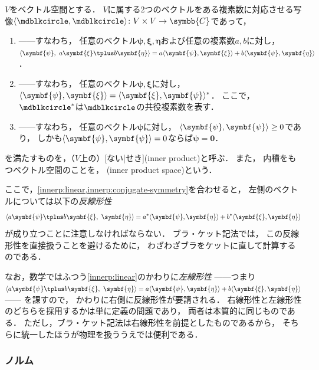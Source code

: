 \documentclass[
]{sotsu}
\newcommand{\bpsi}{\symbf{\psi}}
\newcommand{\bxi}{\symbf{\xi}}
\newcommand{\beeta}{\symbf{\eta}}
\newcommand{\fire}[1]{\textcolor{fire}{#1}}
\begin{document}
$V$をベクトル空間とする．
$V$に属する2つのベクトルをある複素数に対応させる写像$\iparen{\bigdot, \bigdot} \colon V \times V \to \symbb{C}$であって，
\begin{enumerate}
    \item \label{innerp:linear} 
        ------すなわち，
        \fire{任意のベクトル$\bpsi, \bxi, \beeta$}および\fire{任意の複素数$a, b$}に対し，
        $\iparen{\bpsi, \  a \bxi \vecplus b \beeta} = a \iparen{\bpsi, \bxi} + b \iparen{\bpsi, \beeta}$．
    \item \label{innerp:conjugate-symmetry} 
        ------すなわち，
        \fire{任意のベクトル$\bpsi, \bxi$}に対し，
        $\iparen{\bpsi, \bxi} = \conj{\iparen{\bxi, \bpsi}}$．
        ここで，$\conj{\bigdot}$は$\bigdot$の共役複素数を表す．
    \item \label{innerp:positive-definiteness}
        ------すなわち，
        \fire{任意のベクトル$\bpsi$}に対し，
        $\iparen{\bpsi, \bpsi} \geq 0$であり，
        しかも$\iparen{\bpsi, \bpsi} = 0$ならば$\bpsi = \symbf{0}$．
\end{enumerate}
を満たすものを，（$V$上の）[ない|せき](inner product)と呼ぶ．
また，
内積をもつベクトル空間のことを，
(inner product space)という．

ここで，\cref*{innerp:linear,innerp:conjugate-symmetry}を合わせると，
左側のベクトルについては以下の\emph{反線形性}
\begin{equation}
    \label{eq:anti-linear}
    \iparen{a \bpsi \vecplus b \bxi, \  \beeta}
        = \conj{a} \iparen{\bpsi, \beeta} + \conj{b} \iparen{\bxi, \beeta}
\end{equation}
が成り立つことに注意しなければならない．
ブラ・ケット記法では，
この反線形性を直接扱うことを避けるために，
わざわざブラをケットに直して計算するのである．

なお，数学ではふつう\cref{innerp:linear}のかわりに\emph{左線形性}%
------つまり\(
    \iparen{a \bpsi \vecplus b \bxi, \  \beeta}
    = a \iparen{\bpsi, \beeta} + b \iparen{\bxi, \beeta}
\)------%
を課すので，
かわりに右側に反線形性が要請される．
右線形性と左線形性のどちらを採用するかは単に定義の問題であり，
両者は本質的に同じものである．
ただし，ブラ・ケット記法は右線形性を前提としたものであるから，
そちらに統一したほうが物理を扱ううえでは便利である．





\subsubsection{ノルム}
\label{sec:norm}
\end{document}
